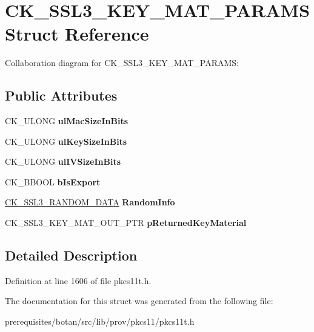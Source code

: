 \hypertarget{struct_c_k___s_s_l3___k_e_y___m_a_t___p_a_r_a_m_s}{}\section{C\+K\+\_\+\+S\+S\+L3\+\_\+\+K\+E\+Y\+\_\+\+M\+A\+T\+\_\+\+P\+A\+R\+A\+MS Struct Reference}
\label{struct_c_k___s_s_l3___k_e_y___m_a_t___p_a_r_a_m_s}


Collaboration diagram for C\+K\+\_\+\+S\+S\+L3\+\_\+\+K\+E\+Y\+\_\+\+M\+A\+T\+\_\+\+P\+A\+R\+A\+MS\+:
\subsection*{Public Attributes}
\begin{DoxyCompactItemize}
\item 
\mbox{\label{struct_c_k___s_s_l3___k_e_y___m_a_t___p_a_r_a_m_s_a02e30c07929506f8a878a24349d99066}} 
C\+K\+\_\+\+U\+L\+O\+NG {\bfseries ul\+Mac\+Size\+In\+Bits}
\item 
\mbox{\label{struct_c_k___s_s_l3___k_e_y___m_a_t___p_a_r_a_m_s_ad2e5b76a9c770b3e55c931ea0bf0cf6a}} 
C\+K\+\_\+\+U\+L\+O\+NG {\bfseries ul\+Key\+Size\+In\+Bits}
\item 
\mbox{\label{struct_c_k___s_s_l3___k_e_y___m_a_t___p_a_r_a_m_s_a273e058984b05fe492b6d61aa9c663f9}} 
C\+K\+\_\+\+U\+L\+O\+NG {\bfseries ul\+I\+V\+Size\+In\+Bits}
\item 
\mbox{\label{struct_c_k___s_s_l3___k_e_y___m_a_t___p_a_r_a_m_s_ae3d9c8286def8fa37af7a192a7cb0c72}} 
C\+K\+\_\+\+B\+B\+O\+OL {\bfseries b\+Is\+Export}
\item 
\mbox{\label{struct_c_k___s_s_l3___k_e_y___m_a_t___p_a_r_a_m_s_a7387cc6814e33f415c8d8911c180e1b3}} 
\mbox{\hyperlink{struct_c_k___s_s_l3___r_a_n_d_o_m___d_a_t_a}{C\+K\+\_\+\+S\+S\+L3\+\_\+\+R\+A\+N\+D\+O\+M\+\_\+\+D\+A\+TA}} {\bfseries Random\+Info}
\item 
\mbox{\label{struct_c_k___s_s_l3___k_e_y___m_a_t___p_a_r_a_m_s_ae594680757bfb006a92c466af54ae88a}} 
C\+K\+\_\+\+S\+S\+L3\+\_\+\+K\+E\+Y\+\_\+\+M\+A\+T\+\_\+\+O\+U\+T\+\_\+\+P\+TR {\bfseries p\+Returned\+Key\+Material}
\end{DoxyCompactItemize}


\subsection{Detailed Description}


Definition at line 1606 of file pkcs11t.\+h.



The documentation for this struct was generated from the following file\+:\begin{DoxyCompactItemize}
\item 
prerequisites/botan/src/lib/prov/pkcs11/pkcs11t.\+h\end{DoxyCompactItemize}
